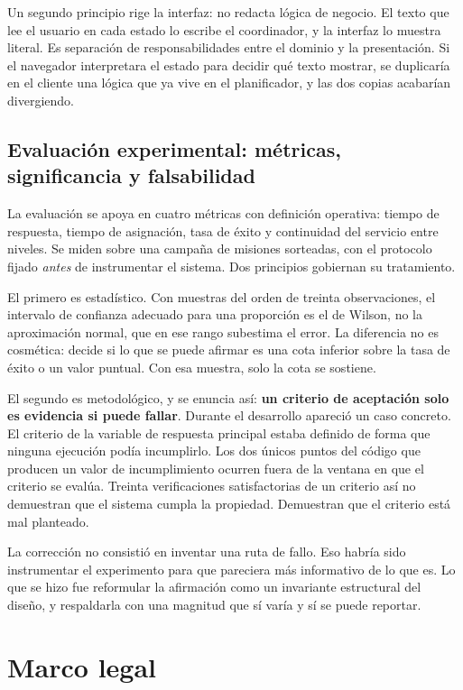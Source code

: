 Un segundo principio rige la interfaz: no redacta lógica de negocio. El texto que
lee el usuario en cada estado lo escribe el coordinador, y la interfaz lo muestra
literal. Es separación de responsabilidades entre el dominio y la presentación.
Si el navegador interpretara el estado para decidir qué texto mostrar, se
duplicaría en el cliente una lógica que ya vive en el planificador, y las dos
copias acabarían divergiendo.

\subsection{Evaluación experimental: métricas, significancia y falsabilidad}

La evaluación se apoya en cuatro métricas con definición operativa: tiempo de
respuesta, tiempo de asignación, tasa de éxito y continuidad del servicio entre
niveles. Se miden sobre una campaña de misiones sorteadas, con el protocolo
fijado \textit{antes} de instrumentar el sistema. Dos principios gobiernan su
tratamiento.

El primero es estadístico. Con muestras del orden de treinta observaciones, el
intervalo de confianza adecuado para una proporción es el de Wilson, no la
aproximación normal, que en ese rango subestima el error. La diferencia no es
cosmética: decide si lo que se puede afirmar es una cota inferior sobre la tasa
de éxito o un valor puntual. Con esa muestra, solo la cota se sostiene.

El segundo es metodológico, y se enuncia así: \textbf{un criterio de aceptación
solo es evidencia si puede fallar}. Durante el desarrollo apareció un caso
concreto. El criterio de la variable de respuesta principal estaba definido de
forma que ninguna ejecución podía incumplirlo. Los dos únicos puntos del código
que producen un valor de incumplimiento ocurren fuera de la ventana en que el
criterio se evalúa. Treinta verificaciones satisfactorias de un criterio así
no demuestran que el sistema cumpla la propiedad. Demuestran que el criterio está
mal planteado.

La corrección no consistió en inventar una ruta de fallo. Eso habría sido
instrumentar el experimento para que pareciera más informativo de lo que es. Lo
que se hizo fue reformular la afirmación como un invariante estructural del
diseño, y respaldarla con una magnitud que sí varía y sí se puede reportar.

\section{Marco legal}

